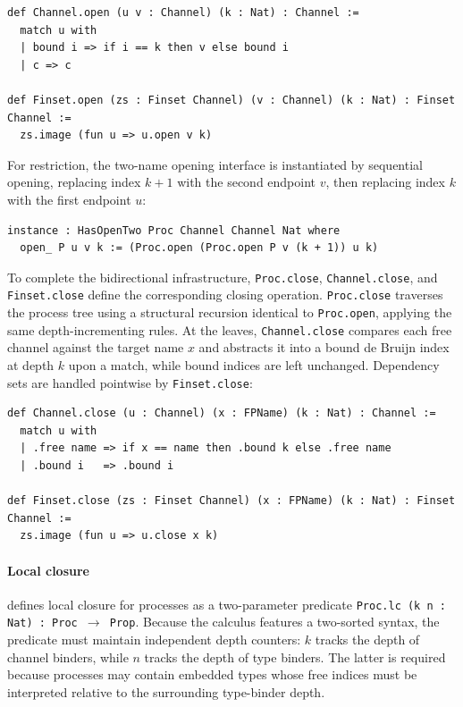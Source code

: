 \begin{lstlisting}[language=Lean4]
def Channel.open (u v : Channel) (k : Nat) : Channel :=
  match u with
  | bound i => if i == k then v else bound i
  | c => c

def Finset.open (zs : Finset Channel) (v : Channel) (k : Nat) : Finset Channel :=
  zs.image (fun u => u.open v k)
\end{lstlisting}

For restriction, the two-name opening interface is instantiated by sequential opening, replacing index $k+1$ with the second endpoint $v$, then replacing index $k$ with the first endpoint $u$:

\begin{lstlisting}[language=Lean4]
instance : HasOpenTwo Proc Channel Channel Nat where
  open_ P u v k := (Proc.open (Proc.open P v (k + 1)) u k)
\end{lstlisting}

To complete the bidirectional infrastructure, \texttt{Proc.close}, \texttt{Channel.close}, and \texttt{Finset.close} define the corresponding closing operation. \texttt{Proc.close} traverses the process tree using a structural recursion identical to \texttt{Proc.open}, applying the same depth-incrementing rules. At the leaves, \texttt{Channel.close} compares each free channel against the target name $x$ and abstracts it into a bound de Bruijn index at depth $k$ upon a match, while bound indices are left unchanged. Dependency sets are handled pointwise by \texttt{Finset.close}:

\begin{lstlisting}[language=Lean4]
def Channel.close (u : Channel) (x : FPName) (k : Nat) : Channel :=
  match u with
  | .free name => if x == name then .bound k else .free name
  | .bound i   => .bound i

def Finset.close (zs : Finset Channel) (x : FPName) (k : Nat) : Finset Channel :=
  zs.image (fun u => u.close x k)
\end{lstlisting}

\paragraph{Local closure}  defines local closure for processes as a two-parameter predicate \texttt{Proc.lc (k n~: Nat)~: Proc $\to$ Prop}. Because the calculus features a two-sorted syntax, the predicate must maintain independent depth counters: $k$ tracks the depth of channel binders, while $n$ tracks the depth of type binders. The latter is required because processes may contain embedded types whose free indices must be interpreted relative to the surrounding type-binder depth.

